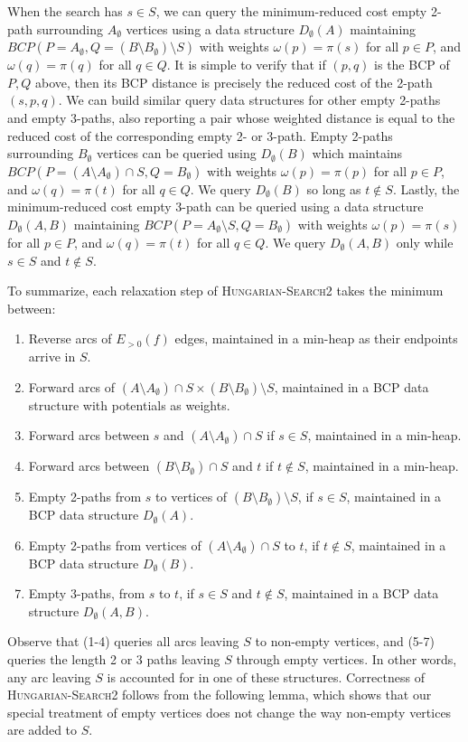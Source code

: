 \documentclass[11pt]{article}
\theoremstyle{plain}
\begin{document}
When the search has $s \in S$, we can query the minimum-reduced cost empty
2-path surrounding $A_\emptyset$ vertices using a data structure
$D_\emptyset(A)$ maintaining
$BCP(P = A_\emptyset, Q = (B \setminus B_\emptyset) \setminus S)$ with weights
$\omega(p) = \pi(s)$ for all $p \in P$, and $\omega(q) = \pi(q)$ for all
$q \in Q$.
It is simple to verify that if $(p, q)$ is the BCP of $P, Q$ above, then its
BCP distance is precisely the reduced cost of the 2-path $(s, p, q)$.
We can build similar query data structures for other empty 2-paths and empty
3-paths, also reporting a pair whose weighted distance is equal to the reduced
cost of the corresponding empty 2- or 3-path.
Empty 2-paths surrounding $B_\emptyset$ vertices can be queried using
$D_\emptyset(B)$ which maintains
$BCP(P = (A \setminus A_\emptyset) \cap S, Q = B_\emptyset)$ with weights
$\omega(p) = \pi(p)$ for all $p \in P$, and $\omega(q) = \pi(t)$ for all
$q \in Q$.
We query $D_\emptyset(B)$ so long as $t \not\in S$.
Lastly, the minimum-reduced cost empty 3-path can be queried using a data
structure $D_\emptyset(A, B)$ maintaining
$BCP(P = A_\emptyset \setminus S, Q = B_\emptyset)$ with weights
$\omega(p) = \pi(s)$ for all $p \in P$, and $\omega(q) = \pi(t)$ for all
$q \in Q$.
We query $D_\emptyset(A, B)$ only while $s \in S$ and $t \not\in S$.

To summarize, each relaxation step of \textsc{Hungarian-Search2} takes the 
minimum between:
\begin{enumerate}
\item Reverse arcs of $E_{>0}(f)$ edges, maintained in a min-heap as their 
	endpoints arrive in $S$.
\item Forward arcs of $(A \setminus A_\emptyset) \cap S \times (B \setminus B_\emptyset) \setminus S$,
	maintained in a BCP data structure with potentials as weights.
\item Forward arcs between $s$ and $(A \setminus A_\emptyset) \cap S$ if
	$s \in S$, maintained in a min-heap.
\item Forward arcs between $(B \setminus B_\emptyset) \cap S$ and $t$ if
	$t \not\in S$, maintained in a min-heap.
\item Empty 2-paths from $s$ to vertices of $(B \setminus B_\emptyset) \setminus S$, if
	$s \in S$, maintained in a BCP data structure $D_\emptyset(A)$.
\item Empty 2-paths from vertices of $(A \setminus A_\emptyset) \cap S$ to $t$, if
	$t \not\in S$, maintained in a BCP data structure $D_\emptyset(B)$.
\item Empty 3-paths, from $s$ to $t$, if $s \in S$ and $t \not\in S$,
	maintained in a BCP data structure $D_\emptyset(A, B)$.
\end{enumerate}
Observe that (1-4) queries all arcs leaving $S$ to non-empty vertices, and 
(5-7) queries the length 2 or 3 paths leaving $S$ through empty vertices.
In other words, any arc leaving $S$ is accounted for in one of these 
structures.
Correctness of \textsc{Hungarian-Search2} follows from the following lemma,
which shows that our special treatment of empty vertices does not change the
way non-empty vertices are added to $S$.
\end{document}

